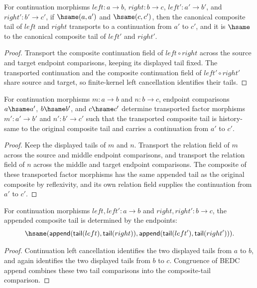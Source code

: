 \begin{theorem}
\label{thm:continuation-morphism-comp-endpoint-hsame-tail-transport}
For continuation morphisms $left:a\to b$, $right:b\to c$,
$left':a'\to b'$, and $right':b'\to c'$, if $\hsame(a,a')$ and
$\hsame(c,c')$, then the canonical composite tail of $left$ and $right$
transports to a continuation from $a'$ to $c'$, and it is $\hsame$ to the
canonical composite tail of $left'$ and $right'$.
\end{theorem}
\begin{proof}
Transport the composite continuation field of $left\circ right$ across the
source and target endpoint comparisons, keeping its displayed tail fixed.
The transported continuation and the composite continuation field of
$left'\circ right'$ share source and target, so finite-kernel left
cancellation identifies their tails.
\end{proof}

\begin{theorem}
\label{thm:category-continuation-morphism-comp-endpoint-transport-exists}
For continuation morphisms $m:a\to b$ and $n:b\to c$, endpoint comparisons
$a\hsame a'$, $b\hsame b'$, and $c\hsame c'$ determine transported factor
morphisms $m':a'\to b'$ and $n':b'\to c'$ such that the transported composite
tail is history-same to the original composite tail and carries a continuation
from $a'$ to $c'$.
\end{theorem}
\begin{proof}
Keep the displayed tails of $m$ and $n$. Transport the relation field of $m$
across the source and middle endpoint comparisons, and transport the relation
field of $n$ across the middle and target endpoint comparisons. The composite
of these transported factor morphisms has the same appended tail as the
original composite by reflexivity, and its own relation field supplies the
continuation from $a'$ to $c'$.
\end{proof}

\begin{theorem}
\label{thm:continuation-morphism-comp-tail-append-deterministic}
For continuation morphisms $left,left':a\to b$ and $right,right':b\to c$, the
appended composite tail is determined by the endpoints:
$$
\hsame(\mathsf{append}(\mathsf{tail}(left),\mathsf{tail}(right)),
\mathsf{append}(\mathsf{tail}(left'),\mathsf{tail}(right'))).
$$
\end{theorem}
\begin{proof}
Continuation left cancellation identifies the two displayed tails from $a$ to
$b$, and again identifies the two displayed tails from $b$ to $c$. Congruence
of BEDC append combines these two tail comparisons into the composite-tail
comparison.
\end{proof}

